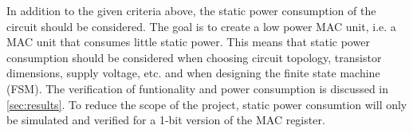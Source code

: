 In addition to the given criteria above, the static power consumption of the circuit should be considered. The goal is to create a low power MAC unit, i.e. a MAC unit that consumes little static power. This means that static power consumption should be considered when choosing circuit topology, transistor dimensions, supply voltage, etc. and when designing the finite state machine (FSM). The verification of funtionality and power consumption is discussed in \autoref{sec:results}. To reduce the scope of the project, static power consumtion will only be simulated and verified for a 1-bit version of the MAC register.